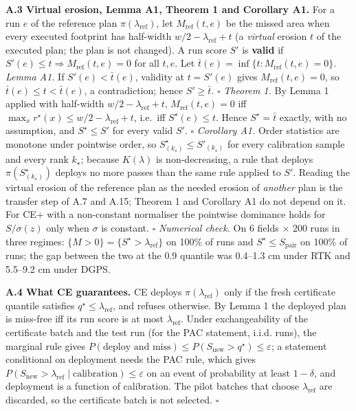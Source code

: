 \documentclass[preprint,12pt,authoryear]{elsarticle}
\begin{document}
\textbf{A.3 Virtual erosion, Lemma A1, Theorem 1 and Corollary A1.} For a run \(e\) of the reference plan \(\pi(\lambda_\mathrm{ref})\), let \(M_\mathrm{ref}(t,e)\) be the missed area when every executed footprint has half-width \(w/2-\lambda_\mathrm{ref}+t\) (a \emph{virtual} erosion \(t\) of the executed plan; the plan is not changed). A run score \(S'\) is \textbf{valid} if \(S'(e)\le t\Rightarrow M_\mathrm{ref}(t,e)=0\) for all \(t,e\). Let \(\bar t(e)=\inf\{t:M_\mathrm{ref}(t,e)=0\}\).
\emph{Lemma A1.} If \(S'(e)<\bar t(e)\), validity at \(t=S'(e)\) gives \(M_\mathrm{ref}(t,e)=0\), so \(\bar t(e)\le t<\bar t(e)\), a contradiction; hence \(S'\ge\bar t\). \(\square\)
\emph{Theorem 1.} By Lemma 1 applied with half-width \(w/2-\lambda_\mathrm{ref}+t\), \(M_\mathrm{ref}(t,e)=0\) iff \(\max_xr^\star(x)\le w/2-\lambda_\mathrm{ref}+t\), i.e.~iff \(S^\star(e)\le t\). Hence \(S^\star=\bar t\) exactly, with no assumption, and \(S^\star\le S'\) for every valid \(S'\). \(\square\)
\emph{Corollary A1.} Order statistics are monotone under pointwise order, so \(S^\star_{(k_\star)}\le S'_{(k_\star)}\) for every calibration sample and every rank \(k_\star\); because \(K(\lambda)\) is non-decreasing, a rule that deploys \(\pi(S^\star_{(k_\star)})\) deploys no more passes than the same rule applied to \(S'\). Reading the virtual erosion of the reference plan as the needed erosion of \emph{another} plan is the transfer step of A.7 and A.15; Theorem 1 and Corollary A1 do not depend on it. For CE+ with a non-constant normaliser the pointwise dominance holds for \(S/\sigma(z)\) only when \(\sigma\) is constant. \(\square\)
\emph{Numerical check.} On 6 fields × 200 runs in three regimes: \(\{M>0\}=\{S^\star>\lambda_\mathrm{ref}\}\) on 100\% of runs and \(S^\star\le S_\mathrm{pair}\) on 100\% of runs; the gap between the two at the 0.9 quantile was 0.4--1.3 cm under RTK and 5.5--9.2 cm under DGPS.

\textbf{A.4 What CE guarantees.} CE deploys \(\pi(\lambda_\mathrm{ref})\) only if the fresh certificate quantile satisfies \(q^\star\le\lambda_\mathrm{ref}\), and refuses otherwise. By Lemma 1 the deployed plan is miss-free iff its run score is at most \(\lambda_\mathrm{ref}\). Under exchangeability of the certificate batch and the test run (for the PAC statement, i.i.d. runs), the marginal rule gives \(P(\text{deploy and miss})\le P(S_\mathrm{new}>q^\star)\le\varepsilon\); a statement conditional on deployment needs the PAC rule, which gives \(P(S_\mathrm{new}>\lambda_\mathrm{ref}\mid\text{calibration})\le\varepsilon\) on an event of probability at least \(1-\delta\), and deployment is a function of calibration. The pilot batches that choose \(\lambda_\mathrm{ref}\) are discarded, so the certificate batch is not selected. \(\square\)
\end{document}
